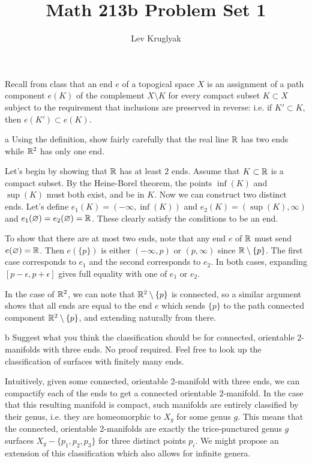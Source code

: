 \documentclass{pset}
\title{Math 213b Problem Set 1}
\author{Lev Kruglyak}
\begin{document}
\maketitle
\collaborators

\begin{problem}{1}
  Recall from class that an end $e$ of a topogical space $X$ is an assignment of a path component $e(K)$ of the complement $X\setminus K$ for every compact subset $K\subset X$ subject to the requirement that inclusions are preserved in reverse: i.e. if $K'\subset K$, then $e(K')\subset e(K)$.
\end{problem}

\begin{parts}
  \begin{part}{a}
    Using the definition, show fairly carefully that the real line $\mathbb{R}$ has two ends while $\mathbb{R}^2$ has only one end.
  \end{part}

  Let's begin by showing that $\mathbb{R}$ has at least $2$ ends. Assume that $K\subset \mathbb{R}$ is a compact subset. By the Heine-Borel theorem, the points $\inf(K)$ and $\sup(K)$ must both exist, and be in $K$. Now we can construct two distinct ends. Let's define $e_1(K) = (-\infty, \inf(K))$ and $e_2(K) = (\sup(K), \infty)$ and $e_1(\varnothing) = e_2(\varnothing)=\mathbb{R}$. These clearly satisfy the conditions to be an end.

  To show that there are at most two ends, note that any end $e$ of $\mathbb{R}$ must send $e(\varnothing) = \mathbb{R}$. Then $e(\{p\})$ is either $(-\infty, p)$ or $(p, \infty)$ since $\mathbb{R}\setminus \{p\}$. The first case corresponds to $e_1$ and the second corresponds to $e_2$. In both cases, expanding $[p-\epsilon, p+\epsilon]$ gives full equality with one of $e_1$ or $e_2$.

  In the case of $\mathbb{R}^2$, we can note that $\mathbb{R}^2\setminus \{p\}$ is connected, so a similar argument shows that all ends are equal to the end $e$ which sends $\{p\}$ to the path connected component $\mathbb{R}^2\setminus \{p\}$, and extending naturally from there.

  \begin{part}{b}
    Suggest what you think the classification should be for connected, orientable
    2-manifolds with three ends. No proof required. Feel free to look up the classification of surfaces with finitely many ends.
  \end{part}

  Intuitively, given some connected, orientable 2-manifold with three ends, we can compactify each of the ends to get a connected orientable $2$-manifold. In the case that this resulting manifold is compact, such manifolds are entirely classified by their genus, i.e. they are homeomorphic to $X_g$ for some genus $g$. This means that the connected, orientable 2-manifolds are exactly the trice-punctured genus $g$ surfaces $X_g - \{p_1, p_2, p_3\}$ for three distinct points $p_i$. We might propose an extension of this classification which also allows for infinite genera.
\end{parts}
\end{document}
